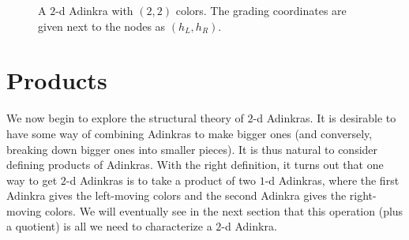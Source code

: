 \documentclass[12pt,twoside,singlespace]{article}
\numberwithin{equation}{section}
\theoremstyle{definition}
\begin{document}
\begin{figure}[htb]
\begin{center}
\caption{A $2$-d Adinkra with $(2,2)$ colors. The grading coordinates are given next to the nodes as $(h_L, h_R)$. \label{fig:2d-example}}
\end{center}
\end{figure}


\section{Products}
\label{sec:products}

We now begin to explore the structural theory of $2$-d Adinkras. It is desirable to have some way of combining Adinkras to make bigger ones (and conversely, breaking down bigger ones into smaller pieces). It is thus natural to consider defining products of Adinkras. With the right definition, it turns out that one way to get $2$-d Adinkras is to take a product of two $1$-d Adinkras, where the first Adinkra gives the left-moving colors and the second Adinkra gives the right-moving colors. We will eventually see in the next section that this operation (plus a quotient) is all we need to characterize a $2$-d Adinkra.
\end{document}
